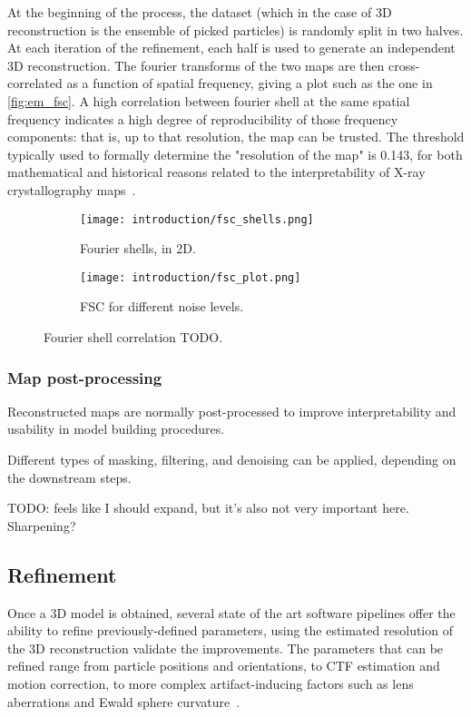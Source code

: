 At the beginning of the process, the dataset (which in the case of 3D reconstruction is the ensemble of picked particles) is randomly split in two halves.
At each iteration of the refinement, each half is used to generate an independent 3D reconstruction.
The fourier transforms of the two maps are then cross-correlated as a function of spatial frequency, giving a plot such as the one in \autoref{fig:em_fsc}.
A high correlation between fourier shell at the same spatial frequency indicates a high degree of reproducibility of those frequency components: that is, up to that resolution, the map can be trusted.
The threshold typically used to formally determine the "resolution of the map" is \num{0.143}, for both mathematical and historical reasons related to the interpretability of X-ray crystallography maps~\cite{rosenthalOptimalDeterminationParticle2003}.

\begin{figure}[ht]
    \centering
    \begin{subfigure}[B]{.5\textwidth}
        \centering
        \texttt{[image: introduction/fsc\_shells.png]}
        \caption{Fourier shells, in 2D.}
        \label{fig:em_fsc_2D}
    \end{subfigure}%
    \hfill
    \begin{subfigure}[B]{.5\textwidth}
        \centering
        \texttt{[image: introduction/fsc\_plot.png]}
        \caption{FSC for different noise levels.}
        \label{fig:em_fsc_1D}
    \end{subfigure}%
    \caption[Fourier shell correlation]{Fourier shell correlation TODO.}
    \label{em_fsc}
\end{figure}

\subsubsection{Map post-processing}
Reconstructed maps are normally post-processed to improve interpretability and usability in model building procedures.

Different types of masking, filtering, and denoising can be applied, depending on the downstream steps.

TODO: feels like I should expand, but it's also not very important here. Sharpening?

\subsection{Refinement}\label{em_refinement}
Once a 3D model is obtained, several state of the art software pipelines offer the ability to refine previously-defined parameters, using the estimated resolution of the 3D reconstruction validate the improvements.
The parameters that can be refined range from particle positions and orientations, to CTF estimation and motion correction, to more complex artifact-inducing factors such as lens aberrations and Ewald sphere curvature~\cite{tegunovMultiparticleCryoEMRefinement2021,punjaniCryoSPARCAlgorithmsRapid2017}.


